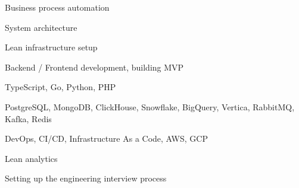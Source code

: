\item Business process automation
\item System architecture
\item Lean infrastructure setup
\item Backend / Frontend development, building MVP
\item TypeScript, Go, Python, PHP
\item PostgreSQL, MongoDB, ClickHouse, Snowflake, BigQuery, Vertica, RabbitMQ,
  Kafka, Redis
\item DevOps, CI/CD, Infrastructure As a Code, AWS, GCP
\item Lean analytics
\item Setting up the engineering interview process

